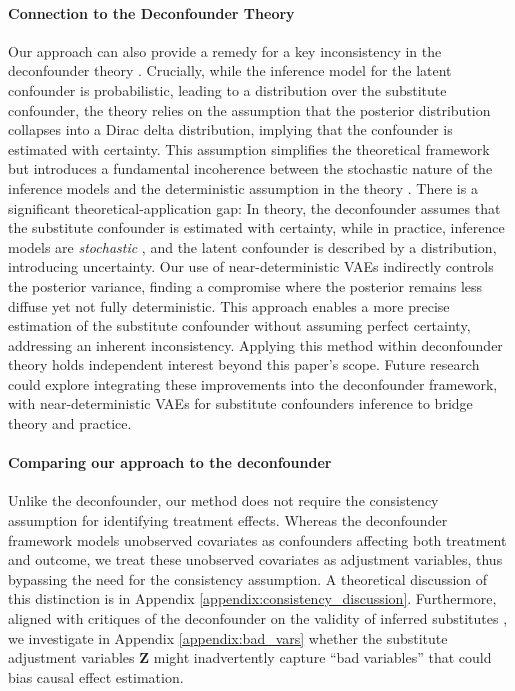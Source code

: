 \documentclass[10pt]{article} %
\begin{document}
\paragraph{Connection to the Deconfounder Theory}
Our approach can also provide a remedy for a key inconsistency in the deconfounder theory \citep{lopezmultipletreatments,ranganath2018multiple, wang2019blessings, wang2019blessingsreply}. Crucially, while the inference model for the latent confounder is probabilistic, leading to a distribution over the substitute confounder, the theory relies on the assumption that the posterior distribution collapses into a Dirac delta distribution, implying that the confounder is estimated with certainty. This assumption simplifies the theoretical framework but introduces a fundamental incoherence between the stochastic nature of the inference models and the deterministic assumption in the theory \citep{d2019comment,imai2019comment, D'AmourMulti-Cause2019}. There is a significant theoretical-application gap: In theory, the deconfounder assumes that the substitute confounder is estimated with certainty, while in practice, inference models are \emph{stochastic} \citep{zhang2019medicalDeconf, Bica2020TimeSDecounf, hatt2024sequential}, and the latent confounder is described by a distribution, introducing uncertainty.   
Our use of near-deterministic VAEs indirectly controls the posterior variance, finding a compromise where the posterior remains less diffuse yet not fully deterministic. This approach enables a more precise estimation of the substitute confounder without assuming perfect certainty, addressing an inherent inconsistency. Applying this method within deconfounder theory holds independent interest beyond this paper’s scope. Future research could explore integrating these improvements into the deconfounder framework, with near-deterministic VAEs for substitute confounders inference to bridge theory and practice. 

\paragraph{Comparing our approach to the deconfounder} Unlike the deconfounder, our method does not require the consistency assumption for identifying treatment effects. Whereas the deconfounder framework models unobserved covariates as confounders affecting both treatment and outcome, we treat these unobserved covariates as adjustment variables, thus bypassing the need for the consistency assumption. A theoretical discussion of this distinction is in Appendix \ref{appendix:consistency_discussion}. Furthermore, aligned with critiques of the deconfounder on the validity of inferred substitutes \citep{d2019comment,imai2019comment, D'AmourMulti-Cause2019, CommentBlessings}, we investigate in Appendix \ref{appendix:bad_vars} whether the substitute adjustment variables \(\mathbf{Z}\) might inadvertently capture “bad variables” that could bias causal effect estimation.
\end{document}
